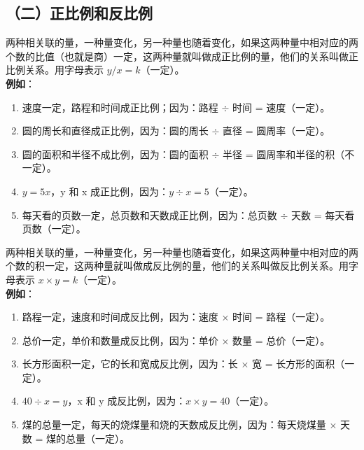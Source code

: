 \subsection*{（二）正比例和反比例}

\begin{definition}[成正比例的量]
    两种相关联的量，一种量变化，另一种量也随着变化，如果这两种量中相对应的两个数的比值（也就是商）一定，这两种量就叫做成正比例的量，他们的关系叫做正比例关系。用字母表示 $y/x = k$（一定）。\\
    \textbf{例如}：
    \begin{enumerate}
        \item 速度一定，路程和时间成正比例；因为：路程 $\div$ 时间 = 速度（一定）。
        \item 圆的周长和直径成正比例，因为：圆的周长 $\div$ 直径 = 圆周率（一定）。
        \item 圆的面积和半径不成比例，因为：圆的面积 $\div$ 半径 = 圆周率和半径的积（不一定）。
        \item $y = 5x$，y 和 x 成正比例，因为：$y \div x = 5$（一定）。
        \item 每天看的页数一定，总页数和天数成正比例，因为：总页数 $\div$ 天数 = 每天看页数（一定）。
    \end{enumerate}
\end{definition}

\begin{definition}[成反比例的量]
    两种相关联的量，一种量变化，另一种量也随着变化，如果这两种量中相对应的两个数的积一定，这两种量就叫做成反比例的量，他们的关系叫做反比例关系。用字母表示 $x \times y = k$（一定）。\\
    \textbf{例如}：
    \begin{enumerate}
        \item 路程一定，速度和时间成反比例，因为：速度 $\times$ 时间 = 路程（一定）。
        \item 总价一定，单价和数量成反比例，因为：单价 $\times$ 数量 = 总价（一定）。
        \item 长方形面积一定，它的长和宽成反比例，因为：长 $\times$ 宽 = 长方形的面积（一定）。
        \item $40 \div x = y$，x 和 y 成反比例，因为：$x \times y = 40$（一定）。
        \item 煤的总量一定，每天的烧煤量和烧的天数成反比例，因为：每天烧煤量 $\times$ 天数 = 煤的总量（一定）。
    \end{enumerate}
\end{definition}

